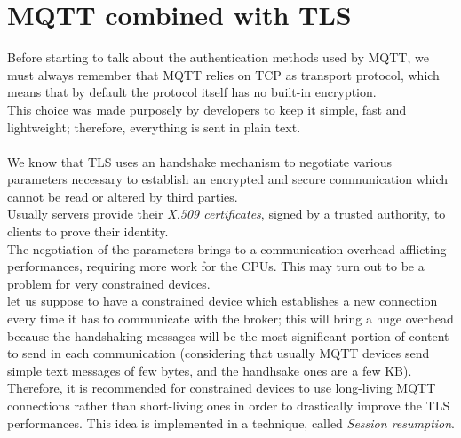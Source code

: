 \documentclass[12pt]{report}
\begin{document}
{\section{MQTT combined with TLS}
\bigskip
Before starting to talk about the authentication methods used by MQTT, we must always remember that MQTT relies on TCP as transport protocol, which means that by default the protocol itself has no built-in encryption.\\
This choice was made purposely by developers to keep it simple, fast and lightweight; therefore, everything is sent in plain text.\\\\
We know that TLS uses an handshake mechanism to negotiate various parameters necessary to establish an encrypted and secure communication which cannot be read or altered by third parties.\\
Usually servers provide their \emph{X.509 certificates}, signed by a trusted authority, to clients to prove their identity.\\
The negotiation of the parameters brings to a communication overhead afflicting performances, requiring more work for the CPUs. This may turn out to be a problem for very constrained devices.\\
let us suppose to have a constrained device which establishes a new connection every time it has to communicate with the broker; this will bring a huge overhead because the handshaking messages will be the most significant portion of content to send in each communication (considering that usually MQTT devices send simple text messages of few bytes, and the handhsake ones are a few KB).\\
Therefore, it is recommended for constrained devices to use long-living MQTT connections rather than short-living ones in order to drastically improve the TLS performances. This idea is implemented in a technique, called \emph{Session resumption}.

}
\end{document}
